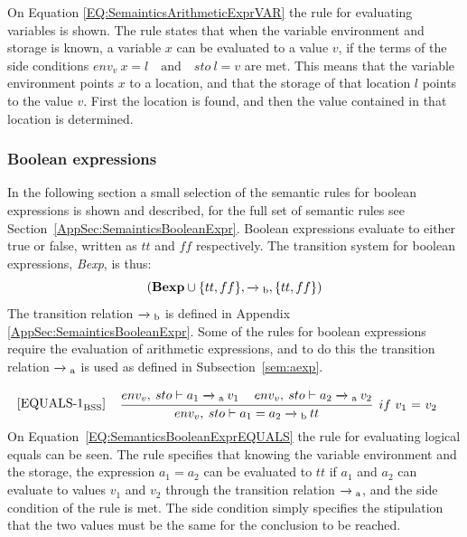On Equation \ref{EQ:SemainticsArithmeticExprVAR} the rule for evaluating variables is shown. The rule states that when the variable environment and storage is known, a variable $x$ can be evaluated to a value $v$, if the terms of the side conditions $env_v \: x = l \quad \text{and} \quad sto \: l = v$ are met. This means that the variable environment points $x$ to a location, and that the storage of that location $l$ points to the value $v$. First the location is found, and then the value contained in that location is determined.



\subsubsection{Boolean expressions}
In the following section a small selection of the semantic rules for boolean expressions is shown and described, for the full set of semantic rules see Section~\ref{AppSec:SemainticsBooleanExpr}.
Boolean expressions evaluate to either true or false, written as $tt$ and $ff$ respectively. The transition system for boolean expressions, \textit{Bexp}, is thus:
\begin{equation*}
    (\textbf{Bexp} \cup \{tt, ff\}, \xrightarrow{} \textsubscript{b}, \{tt, ff\})
\end{equation*}
The transition relation $\xrightarrow{}\textsubscript{b}$ is defined in Appendix~ \ref{AppSec:SemainticsBooleanExpr}. Some of the rules for boolean expressions require the evaluation of arithmetic expressions, and to do this the transition relation $\xrightarrow{}\textsubscript{a}$ is used as defined in Subsection~\ref{sem:aexp}.

\begin{equation}\label{EQ:SemanticsBooleanExprEQUALS}
\begin{minipage}{.2\linewidth}
$[\text{EQUALS-1}_\text{BSS}]$
\end{minipage}
\begin{minipage}{.8\linewidth}
\centering
$\cfrac{env_v, \: sto \vdash a_1 \xrightarrow{}\textsubscript{a} \: v_1 \quad\: env_v, \: sto \vdash a_2 \xrightarrow{}\textsubscript{a} \: v_2}{env_v, \: sto \vdash a_1 = a_2 \xrightarrow{}\textsubscript{b} \: tt}$
$ \: if$ $v_1$ $=$ $v_2$
\end{minipage}
\end{equation}
On Equation~\ref{EQ:SemanticsBooleanExprEQUALS} the rule for evaluating logical equals can be seen. The rule specifies that knowing the variable environment and the storage, the expression $a_1 = a_2$ can be evaluated to $tt$ if $a_1$ and $a_2$ can evaluate to values $v_1$ and $v_2$ through the transition relation $\xrightarrow{} \textsubscript{a}$, and the side condition of the rule is met. The side condition simply specifies the stipulation that the two values must be the same for the conclusion to be reached.

